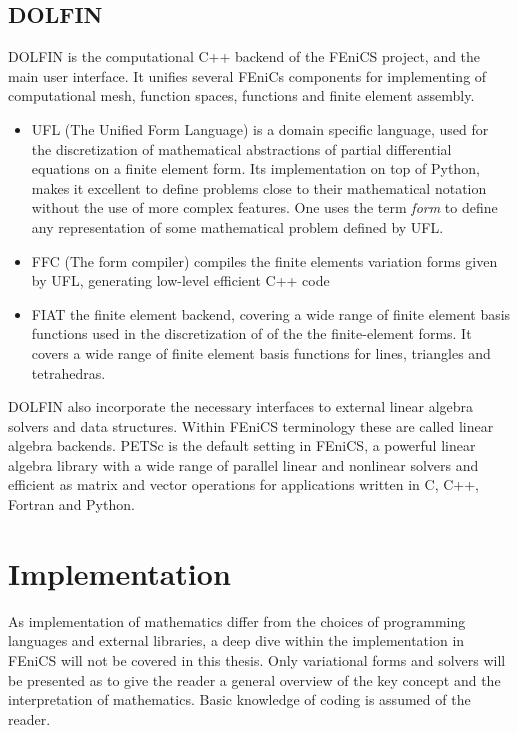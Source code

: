 \subsection{DOLFIN}
DOLFIN is the computational C++ backend of the FEniCS project, and the main user interface. It unifies several FEniCs components for implementing of computational mesh, function spaces, functions and finite element assembly. 

\begin{itemize} 
\item UFL (The Unified Form Language)  is a domain specific language, used for the discretization of mathematical abstractions of partial differential equations on a finite element form. Its implementation on top of Python, makes it excellent to define problems close to their mathematical notation without the use of more complex features. One uses the term \textit{form} to define any representation of some mathematical problem defined by UFL.   

\item FFC (The form compiler) compiles the finite elements variation forms given by UFL, generating low-level efficient C++ code 

\item FIAT the finite element backend, covering a wide range of finite element basis functions used in the discretization of of the  the finite-element forms. It covers a wide range of finite element basis functions for lines, triangles and tetrahedras.

\end{itemize}  


DOLFIN also incorporate the necessary interfaces to external linear algebra solvers and data structures. Within FEniCS terminology these are called linear algebra backends. PETSc is the default setting in FEniCS, a powerful linear algebra library
with a wide range of parallel linear and nonlinear solvers and efficient as matrix and vector operations for applications written in C, C++, Fortran and Python.
\newpage

\section{Implementation}
As implementation of mathematics differ from the choices of programming languages and external libraries, a deep dive within the implementation in FEniCS will not be covered in this thesis. Only variational forms and solvers will be presented as to give the reader a general overview of the key concept and the interpretation of mathematics. Basic knowledge of coding is assumed of the reader. 


